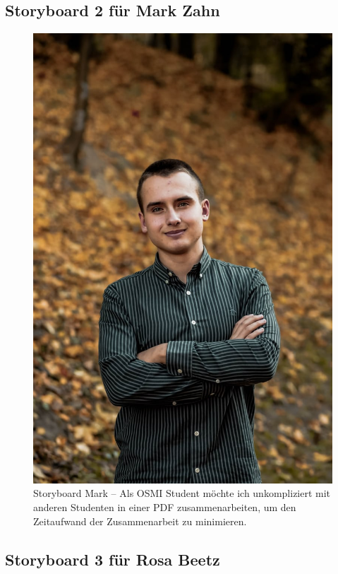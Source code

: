 \documentclass{article}
\begin{document}
\subsection{Storyboard 2 für Mark Zahn}

\begin{figure}[h]
	\includegraphics[angle=90,width=\textwidth]{mark}
	\centering
	\caption{Storyboard Mark – Als OSMI Student möchte ich unkompliziert mit anderen Studenten in einer PDF zusammenarbeiten, um den Zeitaufwand der Zusammenarbeit zu minimieren.}
\end{figure}

\newpage

\subsection{Storyboard 3 für Rosa Beetz}
\end{document}
